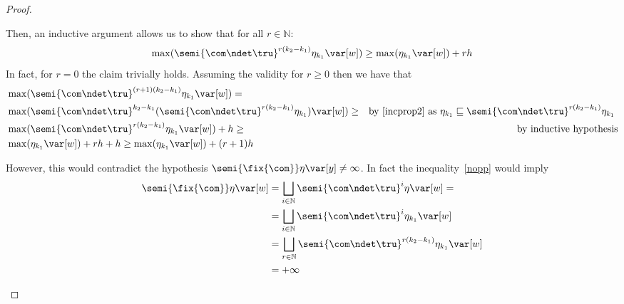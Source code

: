 \begin{proof}
\begin{inductive}
    \noindent    
    Then, an inductive argument allows us to show that for all \(r \in \mathbb{N}\):
    \begin{equation}\label{nopp}
      \max(\semi{\com \ndet \tru}^{r(k_2-k_1)} \eta_{k_1} \var[w]) \geq \max(\eta_{k_1}
      \var[w]) + r h
    \end{equation}  
    In fact, for \(r=0\) the claim trivially holds. Assuming the
    validity for \(r\geq 0\) then we have that
    \begin{align*}    
      & \max(\semi{\com \ndet \tru}^{(r+1)(k_2-k_1)} \eta_{k_1} \var[w]) =\\
      &\max(\semi{\com \ndet \tru}^{k_2-k_1} ( \semi{\com \ndet \tru}^{r(k_2-k_1)} \eta_{k_1}) \var[w]) \geq & \mbox{by~\eqref{incprop2} as \(\eta_{k_1} \sqsubseteq \semi{\com \ndet \tru}^{r(k_2-k_1)} \eta_{k_1}\) }\\
      &\max(\semi{\com \ndet \tru}^{r(k_2-k_1)} \eta_{k_1} \var[w]) + h \geq & \mbox{by inductive hypothesis}\\
      &  \max(\eta_{k_1}\var[w])  + rh + h
        \geq 
        \max(\eta_{k_1}\var[w])  + (r+1)h
    \end{align*}

    \noindent
    However, this would contradict the hypothesis
    \(\semi{\fix{\com}} \eta \var[y] \neq \infty\). In fact the
    inequality~\eqref{nopp} would imply
    \begin{align*}
      \semi{\fix{\com}} \eta \var[w]
      & = \bigsqcup_{i \in \mathbb{N}} \semi{\com
        \ndet \tru}^i \eta \var[w] =\\ 
      & =  \bigsqcup_{i \in \mathbb{N}} \semi{\com \ndet
        \tru}^i \eta_{k_1} \var[w]\\ 
      & = \bigsqcup_{r \in \mathbb{N}} \semi{\com \ndet
        \tru}^{r(k_2-k_1)} \eta_{k_1} \var[w]\\
      & = +\infty
    \end{align*}


\end{inductive}
\end{proof}
